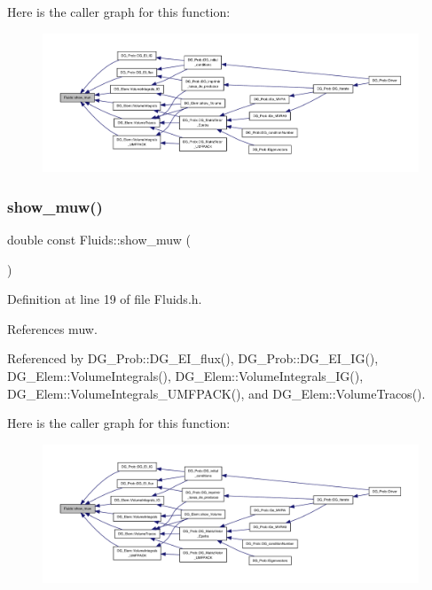 Here is the caller graph for this function\+:
\nopagebreak
\begin{figure}[H]
\begin{center}
\leavevmode
\includegraphics[width=350pt]{classFluids_a426336b6a2fe1d6eb97b2af958d0b5e6_icgraph}
\end{center}
\end{figure}
\mbox{\label{classFluids_ad465f29caf6e368ebaa7662156482c9b}} 
\subsubsection{\texorpdfstring{show\+\_\+muw()}{show\_muw()}}
{\footnotesize\ttfamily double const Fluids\+::show\+\_\+muw (\begin{DoxyParamCaption}{ }\end{DoxyParamCaption})\hspace{0.3cm}{\ttfamily [inline]}}



Definition at line 19 of file Fluids.\+h.



References muw.



Referenced by D\+G\+\_\+\+Prob\+::\+D\+G\+\_\+\+E\+I\+\_\+flux(), D\+G\+\_\+\+Prob\+::\+D\+G\+\_\+\+E\+I\+\_\+\+I\+G(), D\+G\+\_\+\+Elem\+::\+Volume\+Integrals(), D\+G\+\_\+\+Elem\+::\+Volume\+Integrals\+\_\+\+I\+G(), D\+G\+\_\+\+Elem\+::\+Volume\+Integrals\+\_\+\+U\+M\+F\+P\+A\+C\+K(), and D\+G\+\_\+\+Elem\+::\+Volume\+Tracos().

Here is the caller graph for this function\+:
\nopagebreak
\begin{figure}[H]
\begin{center}
\leavevmode
\includegraphics[width=350pt]{classFluids_ad465f29caf6e368ebaa7662156482c9b_icgraph}
\end{center}
\end{figure}
\mbox{\label{classFluids_ad1fe62c857d216c5e87501c772a680e5}} 
